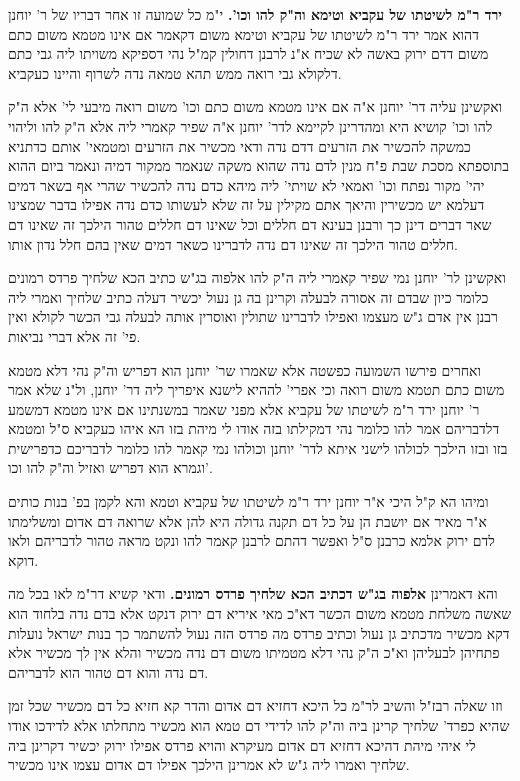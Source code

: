 \documentclass[12pt, openany]{book}
\begin{document}
{\par\textbf{ירד ר"מ לשיטתו של עקביא וטימא וה"ק להו וכו'.}  י"מ כל שמועה זו אחר דבריו של ר' יוחנן דהוא אמר ירד ר"מ לשיטתו של עקביא וטימא משום דקאמר אם אינו מטמא משום כתם משום דדם ירוק באשה לא שכיח א"נ לרבנן דחולין קמ"ל נהי דספיקא משויתו ליה גבי כתם דלקולא גבי רואה ממש תהא טמאה נדה לשרוף והיינו כעקביא.\par  ואקשינן עליה דר' יוחנן א"ה אם אינו מטמא משום כתם וכו' משום רואה מיבעי לי' אלא ה"ק להו וכו' קושיא היא ומהדרינן לקיימא לדר' יוחנן א"ה שפיר קאמרי ליה אלא ה"ק להו וליהוי כמשקה להכשיר את הזרעים דדם נדה ודאי מכשיר את הזרעים ומטמאי' אותם כדתניא בתוספתא מסכת שבת פ"ח מנין לדם נדה שהוא משקה שנאמר ממקור דמיה ונאמר ביום ההוא יהי' מקור נפתח וכו' ואמאי לא שויתי' ליה מיהא כדם נדה להכשיר שהרי אף בשאר דמים דעלמא יש מכשירין והיאך אתם מקילין על זה שלא לעשותו כדם נדה אפילו בדבר שמצינו שאר דברים דינן כך ורבנן בעינא דם חללים וכל שאינו דם חללים טהור הילכך זה שאינו דם חללים טהור הילכך זה שאינו דם נדה לדברינו כשאר דמים שאין בהם חלל נדון אותו.\par  ואקשינן לר' יוחנן נמי שפיר קאמרי ליה ה"ק להו אלפוה בג"ש כתיב הכא שלחיך פרדס רמונים כלומר כיון שבדם זה אסורה לבעלה וקרינן בה גן נעול יכשיר דעלה כתיב שלחיך ואמרי ליה רבנן אין אדם ג"ש מעצמו ואפילו לדברינו שתולין ואוסרין אותה לבעלה גבי הכשר לקולא ואין פי' זה אלא דברי נביאות.\par  ואחרים פירשו השמועה כפשטה אלא שאמרו שר' יוחנן הוא דפריש וה"ק נהי דלא מטמא משום כתם תטמא משום רואה וכי אפרי' לההיא לישנא איפריך ליה דר' יוחנן, ול"נ שלא אמר ר' יוחנן ירד ר"מ לשיטתו של עקביא אלא מפני שאמר במשנתינו אם אינו מטמא דמשמע דלדבריהם אמר להו כלומר נהי דמקילתו בזה אודו לי מיהת בזו הא איהו כעקביא ס"ל ומטמא בזו ובזו הילכך לכולהו לישני איתא לדר' יוחנן וכולהו נמי קאמר להו כלומר לדבריכם כדפרישית וגמרא הוא דפריש ואזיל וה"ק להו וכו'.\par ומיהו הא ק"ל היכי א"ר יוחנן ירד ר"מ לשיטתו של עקביא וטמא והא לקמן בפ' בנות כותים א"ר מאיר אם יושבת הן על כל דם תקנה גדולה היא להן אלא שרואה דם אדום ומשלימתו לדם ירוק אלמא כרבנן ס"ל ואפשר דהתם לרבנן קאמר להו ונקט מראה טהור לדבריהם ולאו דוקא. 
\par והא דאמרינן \textbf{אלפוה בג"ש דכתיב הכא שלחיך פרדס רמונים.}  ודאי קשיא דר"מ לאו בכל מה שאשה משלחת מטמא משום הכשר דא"כ מאי איריא דם ירוק דנקט אלא בדם נדה בלחוד הוא דקא מכשיר מדכתיב גן נעול וכתיב פרדס מה פרדס הזה נעול להשתמר כך בנות ישראל נועלות פתחיהן לבעליהן וא"כ ה"ק נהי דלא מטמיתו משום דם נדה מכשיר והלא אין לך מכשיר אלא דם נדה והוא דם טהור הוא לדבריהם.\par  וזו שאלה רבז"ל והשיב לר"מ כל היכא דחזיא דם אדום והדר קא חזיא כל דם מכשיר שכל זמן שהיא כפרד' שלחיך קרינן ביה וה"ק להו לדידי דם טמא הוא מכשיר מתחלתו אלא לדידכו אודו לי איהי מיהת דהיכא דחזיא דם אדום מעיקרא והויא פרדס אפילו ירוק יכשיר דקרינן ביה שלחיך ואמרו ליה ג"ש לא אמרינן הילכך אפילו דם אדום עצמו אינו מכשיר. 
}
\end{document}
